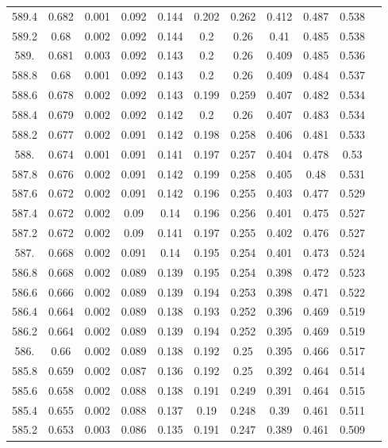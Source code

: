 \documentclass[12pt]{ctexart}
\numberwithin{equation}{section}
\begin{document}
\begin{longtable}{ccccccccccc}
589.4	&	0.682	&	0.001	&	0.092	&	0.144	&	0.202	&	0.262	&	0.412	&	0.487	&	0.538	\\
589.2	&	0.68	&	0.002	&	0.092	&	0.144	&	0.2	&	0.26	&	0.41	&	0.485	&	0.538	\\
589.	&	0.681	&	0.003	&	0.092	&	0.143	&	0.2	&	0.26	&	0.409	&	0.485	&	0.536	\\
588.8	&	0.68	&	0.001	&	0.092	&	0.143	&	0.2	&	0.26	&	0.409	&	0.484	&	0.537	\\
588.6	&	0.678	&	0.002	&	0.092	&	0.143	&	0.199	&	0.259	&	0.407	&	0.482	&	0.534	\\
588.4	&	0.679	&	0.002	&	0.092	&	0.142	&	0.2	&	0.26	&	0.407	&	0.483	&	0.534	\\
588.2	&	0.677	&	0.002	&	0.091	&	0.142	&	0.198	&	0.258	&	0.406	&	0.481	&	0.533	\\
588.	&	0.674	&	0.001	&	0.091	&	0.141	&	0.197	&	0.257	&	0.404	&	0.478	&	0.53	\\
587.8	&	0.676	&	0.002	&	0.091	&	0.142	&	0.199	&	0.258	&	0.405	&	0.48	&	0.531	\\
587.6	&	0.672	&	0.002	&	0.091	&	0.142	&	0.196	&	0.255	&	0.403	&	0.477	&	0.529	\\
587.4	&	0.672	&	0.002	&	0.09	&	0.14	&	0.196	&	0.256	&	0.401	&	0.475	&	0.527	\\
587.2	&	0.672	&	0.002	&	0.09	&	0.141	&	0.197	&	0.255	&	0.402	&	0.476	&	0.527	\\
587.	&	0.668	&	0.002	&	0.091	&	0.14	&	0.195	&	0.254	&	0.401	&	0.473	&	0.524	\\
586.8	&	0.668	&	0.002	&	0.089	&	0.139	&	0.195	&	0.254	&	0.398	&	0.472	&	0.523	\\
586.6	&	0.666	&	0.002	&	0.089	&	0.139	&	0.194	&	0.253	&	0.398	&	0.471	&	0.522	\\
586.4	&	0.664	&	0.002	&	0.089	&	0.138	&	0.193	&	0.252	&	0.396	&	0.469	&	0.519	\\
586.2	&	0.664	&	0.002	&	0.089	&	0.139	&	0.194	&	0.252	&	0.395	&	0.469	&	0.519	\\
586.	&	0.66	&	0.002	&	0.089	&	0.138	&	0.192	&	0.25	&	0.395	&	0.466	&	0.517	\\
585.8	&	0.659	&	0.002	&	0.087	&	0.136	&	0.192	&	0.25	&	0.392	&	0.464	&	0.514	\\
585.6	&	0.658	&	0.002	&	0.088	&	0.138	&	0.191	&	0.249	&	0.391	&	0.464	&	0.515	\\
585.4	&	0.655	&	0.002	&	0.088	&	0.137	&	0.19	&	0.248	&	0.39	&	0.461	&	0.511	\\
585.2	&	0.653	&	0.003	&	0.086	&	0.135	&	0.191	&	0.247	&	0.389	&	0.461	&	0.509	\\

\end{longtable}
\end{document}
